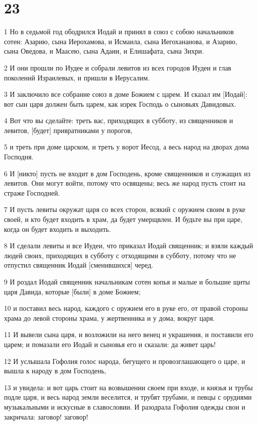 \chapter{23}

\par 1 Но в седьмой год ободрился Иодай и принял в союз с собою начальников сотен: Азарию, сына Иерохамова, и Исмаила, сына Иегохананова, и Азарию, сына Оведова, и Маасею, сына Адаии, и Елишафата, сына Зихри.
\par 2 И они прошли по Иудее и собрали левитов из всех городов Иудеи и глав поколений Израилевых, и пришли в Иерусалим.
\par 3 И заключило все собрание союз в доме Божием с царем. И сказал им [Иодай]: вот сын царя должен быть царем, как изрек Господь о сыновьях Давидовых.
\par 4 Вот что вы сделайте: треть вас, приходящих в субботу, из священников и левитов, [будет] привратниками у порогов,
\par 5 и треть при доме царском, и треть у ворот Иесод, а весь народ на дворах дома Господня.
\par 6 И [никто] пусть не входит в дом Господень, кроме священников и служащих из левитов. Они могут войти, потому что освящены; весь же народ пусть стоит на страже Господней.
\par 7 И пусть левиты окружат царя со всех сторон, всякий с оружием своим в руке своей, и кто будет входить в храм, да будет умерщвлен. И будьте вы при царе, когда он будет входить и выходить.
\par 8 И сделали левиты и все Иудеи, что приказал Иодай священник; и взяли каждый людей своих, приходящих в субботу с отходящими в субботу, потому что не отпустил священник Иодай [сменившихся] черед.
\par 9 И роздал Иодай священник начальникам сотен копья и малые и большие щиты царя Давида, которые [были] в доме Божием;
\par 10 и поставил весь народ, каждого с оружием его в руке его, от правой стороны храма до левой стороны храма, у жертвенника и у дома, вокруг царя.
\par 11 И вывели сына царя, и возложили на него венец и украшения, и поставили его царем; и помазали его Иодай и сыновья его и сказали: да живет царь!
\par 12 И услышала Гофолия голос народа, бегущего и провозглашающего о царе, и вышла к народу в дом Господень,
\par 13 и увидела: и вот царь стоит на возвышении своем при входе, и князья и трубы подле царя, и весь народ земли веселится, и трубят трубами, и певцы с орудиями музыкальными и искусные в славословии. И разодрала Гофолия одежды свои и закричала: заговор! заговор!
